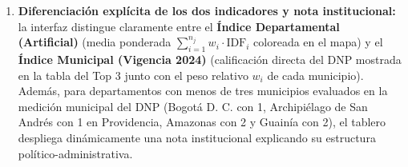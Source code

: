 \documentclass[
  10pt,
  letterpaper,
  DIV=11,
  numbers=noendperiod]{scrartcl}
\providecommand{\tightlist}{%
  \setlength{\itemsep}{0pt}\setlength{\parskip}{0pt}}
\begin{document}
\begin{enumerate}
  \begin{itemize}
  \tightlist
  \item
    Cuando el usuario hace clic sobre un polígono departamental en el
    mapa (\texttt{input\$mapa\_leaflet\_shape\_click}), un observador
    \texttt{observeEvent} actualiza automáticamente el menú desplegable
    (\texttt{updateSelectInput(session,\ "depto\_sel",\ ...)}).
  \item
    Recíprocamente, cuando el usuario elige un departamento en el menú
    desplegable (\texttt{input\$depto\_sel}), un segundo observador
    invoca \texttt{leafletProxy("mapa\_leaflet")} para trazar un
    contorno resaltado sobre el departamento seleccionado y ajustar
    suavemente el encuadre geográfico (\texttt{flyToBounds}),
    manteniendo sincronizadas las tres tarjetas de indicadores
    (\texttt{value\_box}), el mapa y la tabla del Top 3 municipal.
  \end{itemize}
\item
  \textbf{Diferenciación explícita de los dos indicadores y nota
  institucional:} la interfaz distingue claramente entre el
  \textbf{Índice Departamental (Artificial)} (media ponderada
  \(\sum_{i=1}^{n_j} w_i \cdot \text{IDF}_i\) coloreada en el mapa) y el
  \textbf{Índice Municipal (Vigencia 2024)} (calificación directa del
  DNP mostrada en la tabla del Top 3 junto con el peso relativo \(w_i\)
  de cada municipio). Además, para departamentos con menos de tres
  municipios evaluados en la medición municipal del DNP (Bogotá D. C.
  con 1, Archipiélago de San Andrés con 1 en Providencia, Amazonas con 2
  y Guainía con 2), el tablero despliega dinámicamente una nota
  institucional explicando su estructura político-administrativa.
\end{enumerate}
\end{document}
